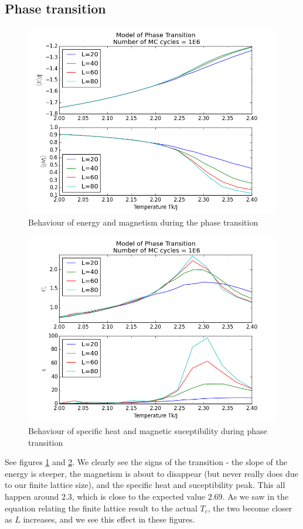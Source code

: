 \documentclass[norsk, 10pt, twocolumn, a4paper]{revtex4}
\begin{document}
\subsection{Phase transition}
\begin{figure}
    \includegraphics[width=0.9\linewidth]{e1.png}
    \caption{
        \label{fig:e1}
        Behaviour of energy and magnetism during the phase transition}
\end{figure}
\begin{figure}
    \includegraphics[width=0.9\linewidth]{e2.png}
    \caption{
        \label{fig:e2}
        Behaviour of specific heat and magnetic suceptibility during phase transition}
\end{figure}
See figures \ref{fig:e1} and \ref{fig:e2}.
We clearly see the signs of the transition - the slope of the energy is steeper,
the magnetism is about to disappear (but never really does due to our finite lattice size),
and the specific heat and suceptibility peak. This all happen around $2.3$, which is close
to the expected value $2.69$. As we saw in the equation relating the finite lattice result to
the actual $T_c$, the two become closer as $L$ increases, and we see this effect in these figures.
\end{document}
